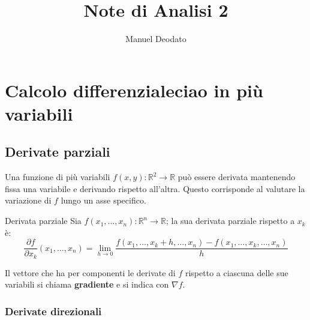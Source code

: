 \documentclass[10pt, a4paper]{scrartcl}
\title{Note di Analisi 2}
\author{Manuel Deodato}
\date{}
\theoremstyle{definition}
\numberwithin{esempio}{section}
\theoremstyle{definition}
\numberwithin{obs}{section}
\numberwithin{nota}{section}
\renewcommand{\maketitle}{
\begin{center}
{\sffamily
{\fontsize{20}{20}\selectfont\MakeUppercase\thetitle}}

\vspace{0.2in}

{\large\scshape\sffamily\theauthor}
\end{center}
}
\numberwithin{equation}{subsection}
\begin{document}
\maketitle
\newpage
\tableofcontents 
\newpage
\section{Calcolo differenzialeciao in pi\`u variabili}
\subsection{Derivate parziali}

Una funzione di pi\`u variabili $f(x,y):\mathbb{R}^2 \to \mathbb{R}$ pu\`o essere derivata mantenendo fissa una variabile e derivando rispetto all'altra. Questo corrisponde al valutare la variazione di $f$ lungo un asse specifico.
\begin{definizione}
	{Derivata parziale}{}
	Sia $f(x_1,\ldots,x_n) :\mathbb{R}^n \to \mathbb{R}$; la sua derivata parziale rispetto a $x_k$ \`e:
	\begin{equation}
		\frac{\partial f}{\partial x_k}(x_1,\ldots,x_n) = \lim_{h \to 0} \frac{f(x_1,\ldots,x_k + h, \ldots, x_n)-f(x_1,\ldots,x_k,\ldots,x_n)}{h}
	\end{equation}
\end{definizione}
\noindent Il vettore che ha per componenti le derivate di $f$ rispetto a ciascuna delle sue variabili si chiama \textbf{gradiente} e si indica con $\nabla f$.

\subsubsection{Derivate direzionali}
\end{document}
